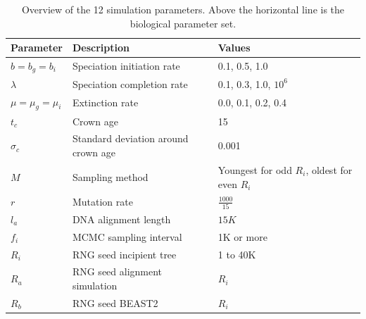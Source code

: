 \documentclass{article}
\begin{document}
\begin{table}
  \centering 
  \begin{tabular}{l l l}
    \hline
    Parameter             & Description & Values \\
    \hline
    \hline
    $b = b_g = b_i$       & Speciation initiation rate & 0.1, 0.5, 1.0 \\
    $\lambda$             & Speciation completion rate & 0.1, 0.3, 1.0, $10^6$ \\
    $\mu = \mu_g = \mu_i$ & Extinction rate & 0.0, 0.1, 0.2, 0.4 \\
    \hline
    $t_c$                 & Crown age & 15 \\
    $\sigma_c$            & Standard deviation around crown age & 0.001 \\
    $M$                   & Sampling method & Youngest for odd $R_i$, oldest for even $R_i$ \\
    $r$                   & Mutation rate & $\frac{1000}{15}$ \\
    $l_a$                 & DNA alignment length & $15K$ \\
    $f_i$                 & MCMC sampling interval & 1K or more \\
    $R_i$                 & RNG seed incipient tree & 1 to 40K \\
    $R_a$                 & RNG seed alignment simulation & $R_i$ \\
    $R_b$                 & RNG seed BEAST2 & $R_i$ \\
    \hline
  \end{tabular}
  \caption{
    Overview of the 12 simulation parameters. Above the horizontal line is 
    the biological parameter set.
  }
  \label{table:parameters}
\end{table}
\end{document}
